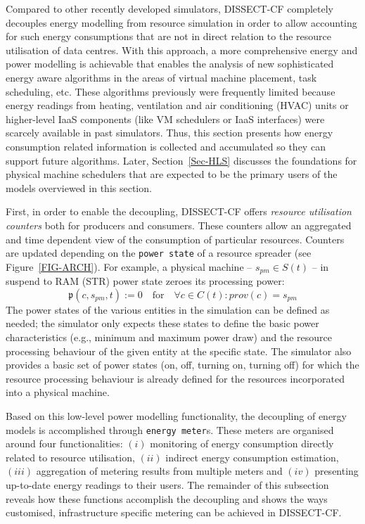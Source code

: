\documentclass[sort, compress, 5p]{elsarticle}
\begin{document}
Compared to other recently developed simulators, DISSECT-CF completely decouples energy modelling from resource simulation in order to allow accounting for such energy consumptions that are not in direct relation to the resource utilisation of data centres. With this approach, a more comprehensive energy and power modelling is achievable that enables the analysis of new sophisticated energy aware algorithms in the areas of virtual machine placement, task scheduling, etc. These algorithms previously were frequently limited because energy readings from heating, ventilation and air conditioning (HVAC) units or higher-level IaaS components (like VM schedulers or IaaS interfaces) were scarcely available in past simulators. Thus, this section presents how energy consumption related information is collected and accumulated so they can support future algorithms. Later, Section~\ref{Sec-HLS} discusses the foundations for physical machine schedulers that are expected to be the primary users of the models overviewed in this section.

First, in order to enable the decoupling, DISSECT-CF offers \emph{resource utilisation counters} both for producers and consumers. These counters allow an aggregated and time dependent view of the consumption of particular resources. Counters are updated depending on the \verb+power state+ of a resource spreader (see Figure~\ref{FIG-ARCH}). For example, a physical machine -- $s_{pm} \in S(t)$ -- in suspend to RAM (STR) power state zeroes its processing power: 
\begin{equation}
\mathfrak{p}(c,s_{pm},t):=0\quad\mathrm{for}\quad\forall c\in C(t):prov(c)=s_{pm}
\end{equation}
The power states of the various entities in the simulation can be defined as needed; the simulator only expects these states to define the basic power characteristics (e.g., minimum and maximum power draw) and the resource processing behaviour of the given entity at the specific state. The simulator also provides a basic set of power states (on, off, turning on, turning off) for which the resource processing behaviour is already defined for the resources incorporated into a physical machine.

Based on this low-level power modelling functionality, the decoupling of energy models is accomplished through  \verb+energy meter+s. These meters are organised around four functionalities: $(i)$ monitoring of energy consumption directly related to resource utilisation, $(ii)$ indirect energy consumption estimation, $(iii)$ aggregation of metering results from multiple meters and $(iv)$ presenting up-to-date energy readings to their users. The remainder of this subsection reveals how these functions accomplish the decoupling and shows the ways customised, infrastructure specific metering can be achieved in DISSECT-CF.
\end{document}
